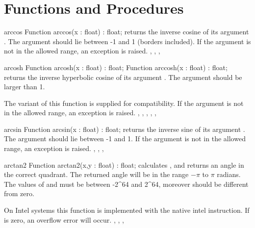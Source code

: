 \section{Functions and Procedures}

\begin{function}{arccos}
\Declaration
Function arccos(x : float) : float;
\Description
{} returns the inverse cosine of its argument . The
argument  should lie between -1 and 1 (borders included). 
\Errors
If the argument  is not in the allowed range, an
 exception is raised.
\SeeAlso
{}, , , 
\end{function}


\begin{function}{arcosh}
\Declaration
Function arcosh(x : float) : float;
Function arccosh(x : float) : float;
\Description
{} returns the inverse hyperbolic cosine of its argument . 
The argument  should be larger than 1. 

The  variant of this function is supplied for \delphi 
compatibility.
\Errors
If the argument  is not in the allowed range, an 
exception is raised.
\SeeAlso
{}, , , , ,
\end{function}


\begin{function}{arcsin}
\Declaration
Function arcsin(x : float) : float;
\Description
{} returns the inverse sine of its argument . The
argument  should lie between -1 and 1. 
\Errors
If the argument  is not in the allowed range, an 
exception is raised.
\SeeAlso
{}, , , 
\end{function}



\begin{function}{arctan2}
\Declaration
Function arctan2(x,y : float) : float;
\Description
{} calculates , and returns an angle in the
correct quadrant. The returned angle will be in the range $-\pi$ to
$\pi$ radians.
The values of  and  must be between -2\^{}64 and 2\^{}64,
moreover  should be different from zero.

On Intel systems this function is implemented with the native intel
 instruction.
\Errors
If  is zero, an overflow error will occur.
\SeeAlso
{}, , , 
\end{function}


